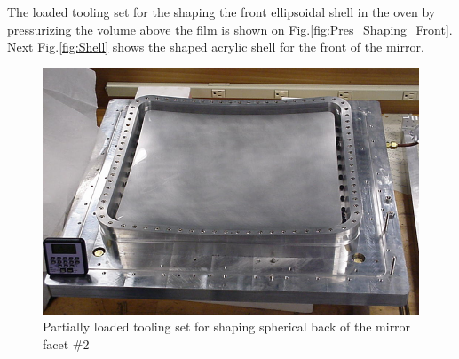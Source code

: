 The loaded tooling set for the shaping the front ellipsoidal shell in the oven by pressurizing the volume above the film is shown on  Fig.\ref{fig:Pres_Shaping_Front}. 
Next Fig.\ref{fig:Shell} shows the shaped acrylic shell for the front of the mirror.

\begin{figure}[h]
    \centering
    \includegraphics[width=0.95\linewidth]{Vac_Mol_Back.png}
    \caption{Partially loaded tooling set for shaping spherical back of the mirror facet \#2}
    \label{fig:Vac_Mol_Back}
\end{figure}{}

